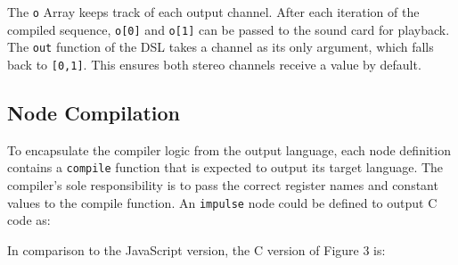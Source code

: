 \documentclass[11pt,]{article}
\newenvironment{Shaded}{}{}
\newcommand{\DataTypeTok}[1]{\textcolor[rgb]{0.56,0.13,0.00}{#1}}
\newcommand{\DecValTok}[1]{\textcolor[rgb]{0.25,0.63,0.44}{#1}}
\newcommand{\FunctionTok}[1]{\textcolor[rgb]{0.02,0.16,0.49}{#1}}
\newcommand{\KeywordTok}[1]{\textcolor[rgb]{0.00,0.44,0.13}{\textbf{#1}}}
\newcommand{\NormalTok}[1]{#1}
\newcommand{\OperatorTok}[1]{\textcolor[rgb]{0.40,0.40,0.40}{#1}}
\newcommand{\SpecialCharTok}[1]{\textcolor[rgb]{0.25,0.44,0.63}{#1}}
\newcommand{\StringTok}[1]{\textcolor[rgb]{0.25,0.44,0.63}{#1}}
\newcommand{\VerbatimStringTok}[1]{\textcolor[rgb]{0.25,0.44,0.63}{#1}}
\begin{document}
The \texttt{o} Array keeps track of each output channel. After each
iteration of the compiled sequence, \texttt{o{[}0{]}} and
\texttt{o{[}1{]}} can be passed to the sound card for playback. The
\texttt{out} function of the DSL takes a channel as its only argument,
which falls back to \texttt{{[}0,1{]}}. This ensures both stereo
channels receive a value by default.

\subsection{Node Compilation}\label{node-compilation}

To encapsulate the compiler logic from the output language, each node
definition contains a \texttt{compile} function that is expected to
output its target language. The compiler's sole responsibility is to
pass the correct register names and constant values to the compile
function. An \texttt{impulse} node could be defined to output C code as:

\begin{Shaded}
\end{Shaded}

In comparison to the JavaScript version, the C version of Figure 3 is:
\end{document}
